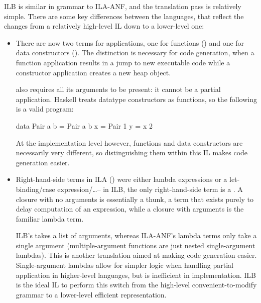 \documentclass[dissertation.tex]{subfiles}
\begin{document}
{{{            ILB is similar in grammar to ILA-ANF, and the translation pass is relatively simple. There are some key
            differences between the languages, that reflect the changes from a relatively high-level IL down to a
            lower-level one:

            \begin{itemize}
            \item
            {

                There are now two terms for applications, one for functions () and one for data
                constructors (). The distinction is necessary for code generation, when a function
                application results in a jump to new executable code while a constructor application creates a new heap
                object.

                 also requires all its arguments to be present: it cannot be a partial application.
                Haskell treats datatype constructors as functions, so the following is a valid program:

                \begin{haskellfigure}
                data Pair a b = Pair a b
                x = Pair 1
                y = x 2
                \end{haskellfigure}

                At the implementation level however, functions and data constructors are necessarily very different, so
                distinguishing them within this IL makes code generation easier.


            }
            \item
            {

                Right-hand-side terms in ILA () were either lambda expressions or a let-binding/case
                expression/\dots -- in ILB, the only right-hand-side term is a . A closure with no
                arguments is essentially a thunk, a term that exists purely to delay computation of an expression, while
                a closure with arguments is the familiar lambda term.

                ILB's  takes a list of arguments, whereas ILA-ANF's lambda terms only take a single
                argument (multiple-argument functions are just nested single-argument lambdas). This is another
                translation aimed at making code generation easier. Single-argument lambdas allow for simpler logic when
                handling partial application in higher-level languages, but is inefficient in implementation. ILB is the
                ideal IL to perform this switch from the high-level convenient-to-modify grammar to a lower-level
                efficient representation.

}
\end{itemize}}}}
\end{document}
